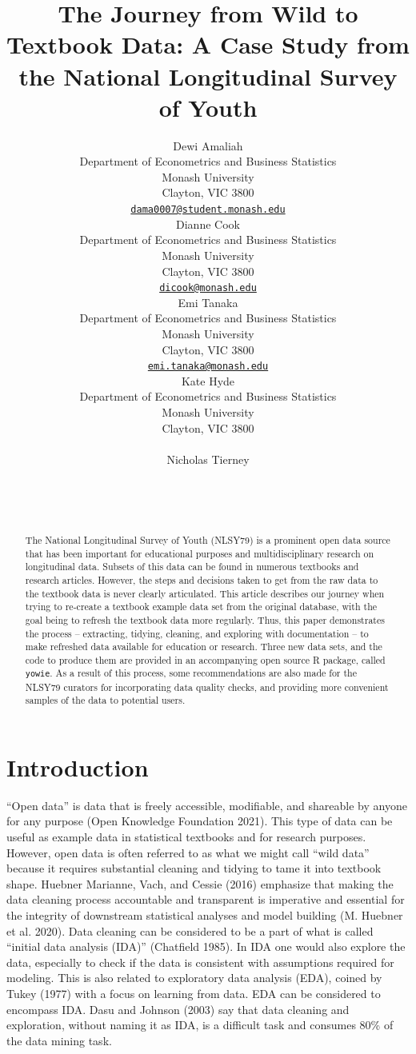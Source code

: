 \documentclass{article}
\title{The Journey from Wild to Textbook Data: A Case Study from the National Longitudinal Survey of Youth}
\author{
    Dewi Amaliah
   \\
    Department of Econometrics and Business Statistics \\
    Monash University \\
  Clayton, VIC 3800 \\
  \texttt{\href{mailto:dama0007@student.monash.edu}{\nolinkurl{dama0007@student.monash.edu}}} \\
   \And
    Dianne Cook
   \\
    Department of Econometrics and Business Statistics \\
    Monash University \\
  Clayton, VIC 3800 \\
  \texttt{\href{mailto:dicook@monash.edu}{\nolinkurl{dicook@monash.edu}}} \\
   \And
    Emi Tanaka
   \\
    Department of Econometrics and Business Statistics \\
    Monash University \\
  Clayton, VIC 3800 \\
  \texttt{\href{mailto:emi.tanaka@monash.edu}{\nolinkurl{emi.tanaka@monash.edu}}} \\
   \And
    Kate Hyde
   \\
    Department of Econometrics and Business Statistics \\
    Monash University \\
  Clayton, VIC 3800 \\
  \texttt{} \\
   \And
    Nicholas Tierney
   \\
     \\
   \\
  \texttt{} \\
  }
\begin{document}
\maketitle

\def\tightlist{}


\begin{abstract}
The National Longitudinal Survey of Youth (NLSY79) is a prominent open data source that has been important for educational purposes and multidisciplinary research on longitudinal data. Subsets of this data can be found in numerous textbooks and research articles. However, the steps and decisions taken to get from the raw data to the textbook data is never clearly articulated. This article describes our journey when trying to re-create a textbook example data set from the original database, with the goal being to refresh the textbook data more regularly. Thus, this paper demonstrates the process -- extracting, tidying, cleaning, and exploring with documentation -- to make refreshed data available for education or research. Three new data sets, and the code to produce them are provided in an accompanying open source R package, called \texttt{yowie}. As a result of this process, some recommendations are also made for the NLSY79 curators for incorporating data quality checks, and providing more convenient samples of the data to potential users.
\end{abstract}


\hypertarget{intro}{%
\section{Introduction}\label{intro}}

``Open data'' is data that is freely accessible, modifiable, and shareable by anyone for any purpose (Open Knowledge Foundation 2021). This type of data can be useful as example data in statistical textbooks and for research purposes. However, open data is often referred to as what we might call ``wild data'' because it requires substantial cleaning and tidying to tame it into textbook shape. Huebner Marianne, Vach, and Cessie (2016) emphasize that making the data cleaning process accountable and transparent is imperative and essential for the integrity of downstream statistical analyses and model building (M. Huebner et al. 2020).
Data cleaning can be considered to be a part of what is called ``initial data analysis (IDA)'' (Chatfield 1985). In IDA one would also explore the data, especially to check if the data is consistent with assumptions required for modeling. This is also related to exploratory data analysis (EDA), coined by Tukey (1977) with a focus on learning from data. EDA can be considered to encompass IDA. Dasu and Johnson (2003) say that data cleaning and exploration, without naming it as IDA, is a difficult task and consumes 80\% of the data mining task.
\end{document}
